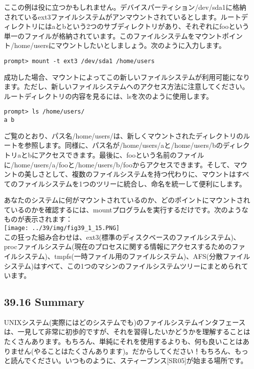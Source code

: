 ここの例は役に立つかもしれません。デバイスパーティション/dev/sda1に格納されているext3ファイルシステムがアンマウントされているとします。ルートディレクトリにはaとbという2つのサブディレクトリがあり、それぞれにfooという単一のファイルが格納されています。このファイルシステムをマウントポイント/home/usersにマウントしたいとしましょう。次のように入力します。

\begin{verbatim}
prompt> mount -t ext3 /dev/sda1 /home/users
\end{verbatim}

成功した場合、マウントによってこの新しいファイルシステムが利用可能になります。ただし、新しいファイルシステムへのアクセス方法に注意してください。ルートディレクトリの内容を見るには、lsを次のように使用します。

\begin{verbatim}
prompt> ls /home/users/
a b
\end{verbatim}

ご覧のとおり、パス名/home/users/は、新しくマウントされたディレクトリのルートを参照します。同様に、パス名が/home/users/aと/home/users/bのディレクトリaとbにアクセスできます。最後に、fooという名前のファイルに/home/users/a/fooと/home/users/b/fooからアクセスできます。そして、マウントの美しさとして、複数のファイルシステムを持つ代わりに、マウントはすべてのファイルシステムを1つのツリーに統合し、命名を統一して便利にします。

あなたのシステムに何がマウントされているのか、どのポイントにマウントされているのかを確認するには、mountプログラムを実行するだけです。次のようなものが表示されます：\\
\texttt{[image: ../39/img/fig39\_1\_15.PNG]}\\
この狂った組み合わせは、ext3(標準のディスクベースのファイルシステム)、procファイルシステム(現在のプロセスに関する情報にアクセスするためのファイルシステム)、tmpfs(一時ファイル用のファイルシステム)、AFS(分散ファイルシステム)はすべて、この1つのマシンのファイルシステムツリーにまとめられています。

\hypertarget{summary-26}{%
\subsection*{39.16 Summary}\label{summary-26}}

UNIXシステム(実際にはどのシステムでも)のファイルシステムインタフェースは、一見して非常に初歩的ですが、それを習得したいかどうかを理解することはたくさんあります。もちろん、単純にそれを使用するよりも、何も良いことはありません(やることはたくさんあります)。だからしてください！もちろん、もっと読んでください。いつものように、スティーブンス{[}SR05{]}が始まる場所です。

